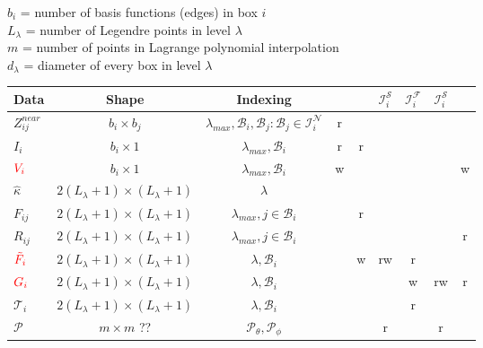 \documentclass{report}
\begin{document}
\begin{table}
$b_i$ = number of  basis functions (edges) in box $i$\\
$L_\lambda$ = number of Legendre points in level $\lambda$\\
$m$ = number of points in Lagrange polynomial interpolation\\
$d_\lambda$ = diameter of every box in level $\lambda$\\
\begin{tabular}{lcc|c|c|c|c|c|c|}
Data & Shape & Indexing &&&$\mathcal{I}^\mathcal{S}_i$&$\mathcal{I}^\mathcal{F}_i$
&$\mathcal{I}^\mathcal{S}_i$&\\
\hline
$Z_{ij}^{near}$ & $b_i\times b_j$& $\lambda_{max}, \mathcal{B}_i,\mathcal{B}_j : \mathcal{B}_j \in \mathcal{I}^\mathcal{N}_i$ &r&&&&&\\
$I_i$ & $b_i\times 1$ & $\lambda_{max}, \mathcal{B}_i$&r&r&&&&\\
$\color{red}{V_i}$ & $b_i\times 1$ & $\lambda_{max}, \mathcal{B}_i$&w&&&&&w\\
$\hat{\kappa}$ & $2(L_\lambda+1)\times (L_\lambda+1)$ & $\lambda$&& &&&&\\
$F_{ij}$ & $2(L_\lambda+1)\times (L_\lambda+1)$ & $\lambda_{max},j \in \mathcal{B}_i$&&r&&&&\\
$R_{ij}$ & $2(L_\lambda+1)\times (L_\lambda+1)$ & $\lambda_{max},j \in \mathcal{B}_i$&&&&&&r\\
$\color{red}{\tilde{F_i}}$ & $2(L_\lambda+1)\times (L_\lambda+1)$ & $\lambda, \mathcal{B}_i$&&w&rw&r&&\\
$\color{red}{G_i}$ & $2(L_\lambda+1)\times (L_\lambda+1)$ & $\lambda, \mathcal{B}_i$&&&&w&rw&r\\
$\mathcal{T}_i$ &  $2(L_\lambda+1)\times (L_\lambda+1)$ & $\lambda, \mathcal{B}_i$&&&&r&&\\
$\mathcal{P}$ & $m\times m$ ??& $\mathcal{P}_\theta, \mathcal{P}_\phi$&&&r&&r&\\
\hline
\end{tabular}
\end{table}
\end{document}
